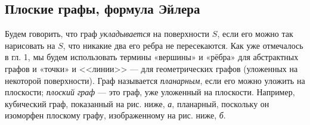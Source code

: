 \subsection{Плоские графы, формула Эйлера}

Будем говорить, что граф \textit{укладывается} на поверхности $S$, если его можно так нарисовать на $S$, что никакие два его ребра не пересекаются. Как уже отмечалось в гл. 1, мы будем использовать термины «вершины» и «рёбра» для абстрактных графов и «точки» и <<линии>> --- для геометрических графов (уложенных на некоторой поверхности). Граф называется \textit{планарным}, если его можно уложить на плоскости; \textit{плоский граф} --- это граф, уже уложенный на плоскости. Например, кубический граф, показанный на рис. ниже, \textit{а}, планарный, поскольку он изоморфен плоскому графу, изображенному на рис. ниже, \textit{б}.

